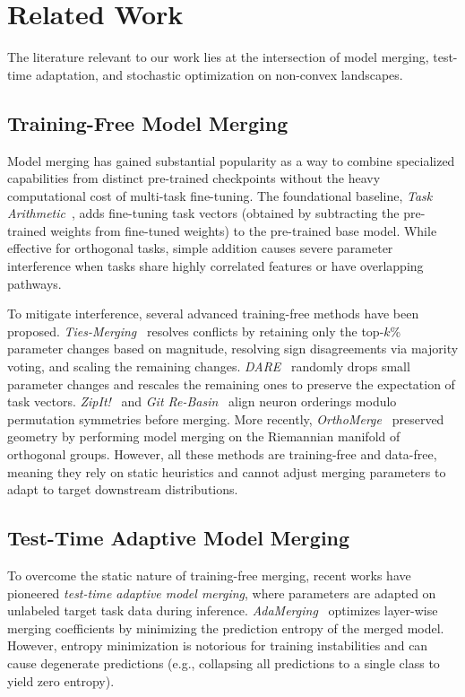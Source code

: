 \section{Related Work}
\label{sec:related_work}

The literature relevant to our work lies at the intersection of model merging, test-time adaptation, and stochastic optimization on non-convex landscapes.

\subsection{Training-Free Model Merging}
Model merging has gained substantial popularity as a way to combine specialized capabilities from distinct pre-trained checkpoints without the heavy computational cost of multi-task fine-tuning.
The foundational baseline, \emph{Task Arithmetic}~\cite{ilharco2022editing}, adds fine-tuning task vectors (obtained by subtracting the pre-trained weights from fine-tuned weights) to the pre-trained base model.
While effective for orthogonal tasks, simple addition causes severe parameter interference when tasks share highly correlated features or have overlapping pathways.

To mitigate interference, several advanced training-free methods have been proposed.
\emph{Ties-Merging}~\cite{yadav2023ties} resolves conflicts by retaining only the top-$k$\% parameter changes based on magnitude, resolving sign disagreements via majority voting, and scaling the remaining changes.
\emph{DARE}~\cite{jin2023dataless} randomly drops small parameter changes and rescales the remaining ones to preserve the expectation of task vectors.
\emph{ZipIt!}~\cite{zhang2024zipit} and \emph{Git Re-Basin}~\cite{ainsworth2023git} align neuron orderings modulo permutation symmetries before merging.
More recently, \emph{OrthoMerge}~\cite{yang2026orthomerge} preserved geometry by performing model merging on the Riemannian manifold of orthogonal groups.
However, all these methods are training-free and data-free, meaning they rely on static heuristics and cannot adjust merging parameters to adapt to target downstream distributions.

\subsection{Test-Time Adaptive Model Merging}
To overcome the static nature of training-free merging, recent works have pioneered \emph{test-time adaptive model merging}, where parameters are adapted on unlabeled target task data during inference.
\emph{AdaMerging}~\cite{yang2024adamerging} optimizes layer-wise merging coefficients by minimizing the prediction entropy of the merged model.
However, entropy minimization is notorious for training instabilities and can cause degenerate predictions (e.g., collapsing all predictions to a single class to yield zero entropy).

